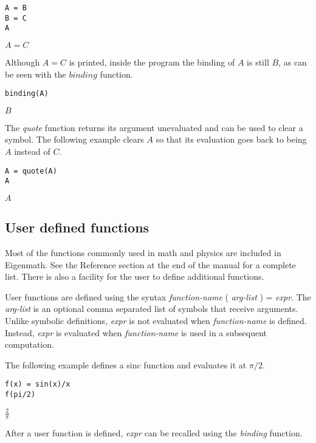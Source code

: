 \begin{Verbatim}[formatcom=\color{blue}]
A = B
B = C
A
\end{Verbatim}

\noindent
$\displaystyle A=C$

\bigskip
\noindent
Although $A=C$ is printed,
inside the program the binding of $A$ is still $B$, as can be seen with
the $binding$ function.

\begin{Verbatim}[formatcom=\color{blue}]
binding(A)
\end{Verbatim}

\noindent
$\displaystyle B$

\bigskip
\noindent
The {\it quote} function returns its argument unevaluated
and can be used to clear a symbol.
The following example clears $A$ so that its evaluation goes back to
being $A$ instead of $C$.

\begin{Verbatim}[formatcom=\color{blue}]
A = quote(A)
A
\end{Verbatim}

\noindent
$\displaystyle A$

\subsection{User defined functions}

Most of the functions commonly used in math and physics are included in Eigenmath.
See the Reference section at the end of the manual for a complete list.
There is also a facility for the user to define additional functions.

\bigskip
\noindent
User functions are defined using the syntax {\it function-name} ( {\it arg-list} ) = {\it expr}.
The {\it arg-list} is an optional comma separated list of symbols that receive arguments.
Unlike symbolic definitions, {\it expr} is not evaluated when {\it function-name} is defined.
Instead, {\it expr} is evaluated when {\it function-name} is used in a subsequent computation.

\bigskip
\noindent
The following example defines a sinc function and evaluates it at $\pi/2$.

\begin{Verbatim}[formatcom=\color{blue}]
f(x) = sin(x)/x
f(pi/2)
\end{Verbatim}

\noindent
$\displaystyle \frac{2}{\pi}$

\bigskip
\noindent
After a user function is defined, {\it expr} can be recalled using the {\it binding} function.

